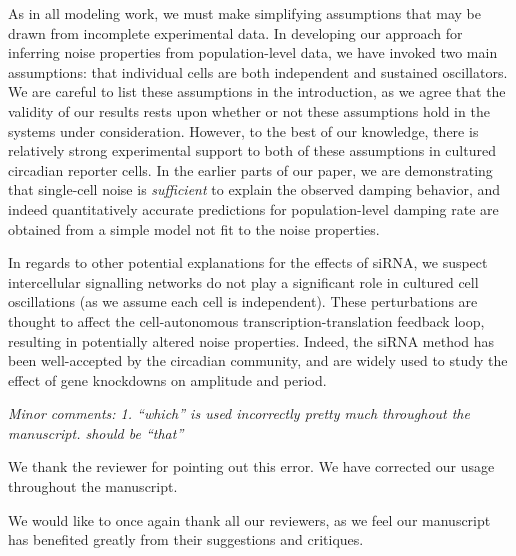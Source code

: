 \documentclass[11pt, letterpaper]{article}
\newenvironment{reviewer}{\itshape\color{gray}}{}
\begin{document}
As in all modeling work, we must make simplifying assumptions that may be drawn from incomplete experimental data.
In developing our approach for inferring noise properties from population-level data, we have invoked two main assumptions: that individual cells are both independent and sustained oscillators.
We are careful to list these assumptions in the introduction, as we agree that the validity of our results rests upon whether or not these assumptions hold in the systems under consideration.
However, to the best of our knowledge, there is relatively strong experimental support to both of these assumptions in cultured circadian reporter cells.
In the earlier parts of our paper, we are demonstrating that single-cell noise is {\itshape sufficient} to explain the observed damping behavior, and indeed quantitatively accurate predictions for population-level damping rate are obtained from a simple model not fit to the noise properties.

In regards to other potential explanations for the effects of siRNA, we suspect intercellular signalling networks do not play a significant role in cultured cell oscillations (as we assume each cell is independent).
These perturbations are thought to affect the cell-autonomous transcription-translation feedback loop, resulting in potentially altered noise properties.
Indeed, the siRNA method has been well-accepted by the circadian community, and are widely used to study the effect of gene knockdowns on amplitude and period.


\begin{reviewer}
Minor comments:
1. ``which'' is used incorrectly pretty much throughout the manuscript. should be ``that''
\end{reviewer}

We thank the reviewer for pointing out this error. We have corrected our usage throughout the manuscript.

We would like to once again thank all our reviewers, as we feel our manuscript has benefited greatly from their suggestions and critiques.
\end{document}
